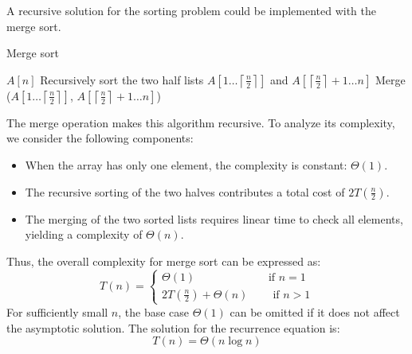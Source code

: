 A recursive solution for the sorting problem could be implemented with the merge sort.
\begin{algorithm}[H]
    \caption{Merge sort}
        \begin{algorithmic}[1]
                \State\Return $A[n]$
            \EndIf
            \State Recursively sort the two half lists $A\left[1\ldots\left\lceil \frac{n}{2}\right\rceil \right]$ and $A\left[\left\lceil \frac{n}{2}\right\rceil + 1 \ldots n\right]$
            \State Merge ($A\left[1\ldots\left\lceil \frac{n}{2}\right\rceil \right]$, $A\left[\left\lceil \frac{n}{2}\right\rceil + 1 \ldots n\right]$)
        \end{algorithmic}
\end{algorithm}
The merge operation makes this algorithm recursive.
To analyze its complexity, we consider the following components:
\begin{itemize}
    \item When the array has only one element, the complexity is constant: $\Theta(1)$. 
    \item The recursive sorting of the two halves contributes a total cost of $2T\left(\frac{n}{2}\right)$. 
    \item The merging of the two sorted lists requires linear time to check all elements, yielding a complexity of $\Theta(n)$. 
\end{itemize}
Thus, the overall complexity for merge sort can be expressed as:
\[T(n)=\begin{cases} \Theta(1)\qquad\qquad\qquad\: \text{ if }n=1 \\ 2T\left(\frac{n}{2}\right) + \Theta(n)\qquad\:\text{if }n>1 \end{cases}\]
For sufficiently small $n$, the base case $\Theta(1)$ can be omitted if it does not affect the asymptotic solution.
The solution for the recurrence equation is: 
\[T(n)=\Theta(n\log n)\]